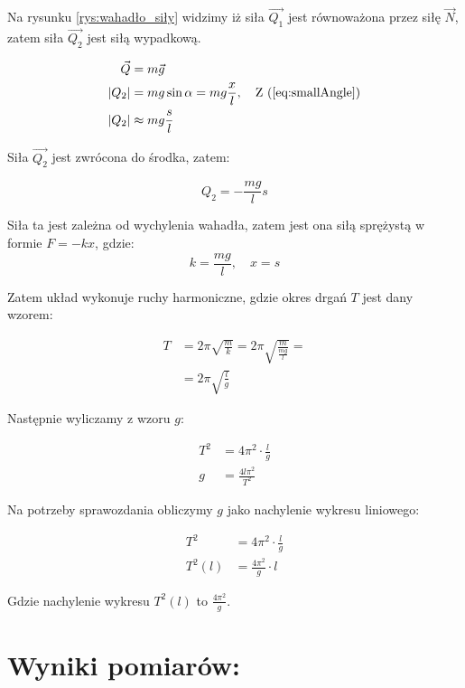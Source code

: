 \documentclass[a4paper,12pt]{article}
\begin{document}
Na rysunku \ref{rys:wahadło_siły} widzimy iż siła $\vec{Q_1}$ jest równoważona przez siłę $\vec{N}$, zatem siła $\vec{Q_2}$ jest siłą wypadkową.

\begin{align*}
	\vec{Q}             & = m\vec{g}                                                             \\
	\left|Q_2 \right|   & = mg\sin{\alpha} = mg\frac{x}{l}, \quad \text{Z (\ref{eq:smallAngle})} \\
	\left| Q_2  \right| & \approx mg \frac{s}{l}
\end{align*}

Siła $\vec{Q_2}$ jest zwrócona do środka, zatem:

\begin{equation*}
	Q_2 = - \frac{mg}{l}s
\end{equation*}

Siła ta jest zależna od wychylenia wahadła, zatem jest ona siłą sprężystą\cite{teoria:force} w formie $F = -kx$, gdzie:
\[k = \frac{mg}{l}, \quad x = s\]

Zatem układ wykonuje ruchy harmoniczne, gdzie okres drgań $T$ jest dany wzorem:

\begin{align*}
	T & = 2 \pi \sqrt{\frac{m}{k}} = 2 \pi \sqrt{\frac{m}{\frac{mg}{l}}} = \\
	  & = 2 \pi \sqrt{\frac{l}{g}}
\end{align*}

Następnie wyliczamy z wzoru $g$:

\begin{align*}
	T^2 & = 4 \pi^2 \cdot \frac{l}{g} \\
	g   & = \frac{4 l \pi^2 }{T^2}
\end{align*}

Na potrzeby sprawozdania obliczymy $g$ jako nachylenie wykresu liniowego:

\begin{align*}
	T^2               & = 4 \pi^2 \cdot \frac{l}{g} \\
	T^2\left(l\right) & = \frac{4 \pi^2}{g} \cdot l
\end{align*}

Gdzie nachylenie wykresu $T^2 \left(l\right)$ to $\frac{4 \pi^2}{g}$.

\section{Wyniki pomiarów:}
\end{document}
